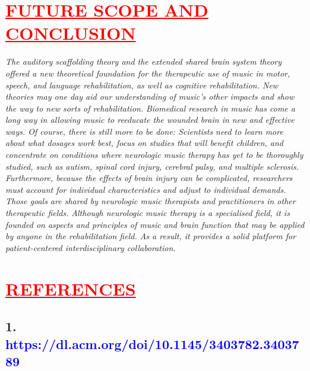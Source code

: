 \documentclass[12pt]{article}
\begin{document}
\section*{\textbf{\hspace{1cm}\textcolor{red}{\underline{\Large{FUTURE SCOPE AND CONCLUSION}}}}}
\hspace{1cm}\Large{\emph{The auditory scaffolding theory and the extended shared brain system theory offered a new theoretical foundation for the therapeutic use of music in motor, speech, and language rehabilitation, as well as cognitive rehabilitation. New theories may one day aid our understanding of music's other impacts and show the way to new sorts of rehabilitation.}}\vspace{1cm}\newline
\hspace{1cm}\Large{\emph{Biomedical research in music has come a long way in allowing music to reeducate the wounded brain in new and effective ways. Of course, there is still more to be done: Scientists need to learn more about what dosages work best, focus on studies that will benefit children, and concentrate on conditions where neurologic music therapy has yet to be thoroughly studied, such as autism, spinal cord injury, cerebral palsy, and multiple sclerosis. Furthermore, because the effects of brain injury can be complicated, researchers must account for individual characteristics and adjust to individual demands. Those goals are shared by neurologic music therapists and practitioners in other therapeutic fields.}}\vspace{1cm}\newline
\hspace{1cm}\Large{\emph{Although neurologic music therapy is a specialised field, it is founded on aspects and principles of music and brain function that may be applied by anyone in the rehabilitation field. As a result, it provides a solid platform for patient-centered interdisciplinary collaboration.}}

\section*{\textbf{\hspace{1cm}\textcolor{red}{\underline{\Large{REFERENCES}}}}}
\vspace{0.2cm}
\subsection*{\textbf{1.\hspace{1cm}\large{\textcolor{blue}{ https://dl.acm.org/doi/10.1145/3403782.3403789}}}}
\end{document}
